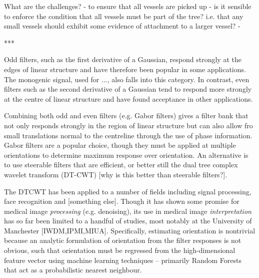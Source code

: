 {What are the challenges?
- to ensure that all vessels are picked up
  - is it sensible to enforce the condition that all vessels must be part of the tree? i.e. that any small vessels should exhibit some evidence of attachment to a larger vessel?
- 


***

Odd filters, such as the first derivative of a Gaussian, respond strongly at the edges of linear structure and have therefore been popular in some applications. The monogenic signal, used for ..., also falls into this category. In contrast, even filters such as the second derivative of a Gaussian tend to respond more strongly at the centre of linear structure and have found acceptance in other applications. 

Combining both odd and even filters (e.g. Gabor filters) gives a filter bank that not only responds strongly in the region of linear structure but can also allow fro small translations normal to the centreline through the use of phase information. Gabor filters are a popular choice, though they must be applied at multiple orientations to determine maximum response over orientation. An alternative is to use steerable filters that are efficient, or better still the dual tree complex wavelet transform (DT-CWT) [why is this better than steerable filters?].

The DTCWT has been applied to a number of fields including signal processing, face recognition and [something else]. Though it has shown some promise for medical image \emph{processing} (e.g. denoising), its use in medical image \emph{interpretation} has so far been limited to a handful of studies, most notably at the University of Manchester [IWDM,IPMI,MIUA]. Specifically, estimating orientation is nontrivial because an analytic formulation of orientation from the filter responses is not obvious, such that orientation must be regressed from the high-dimensional feature vector using machine learning techniques -- primarily Random Forests that act as a probabilistic nearest neighbour.
}

